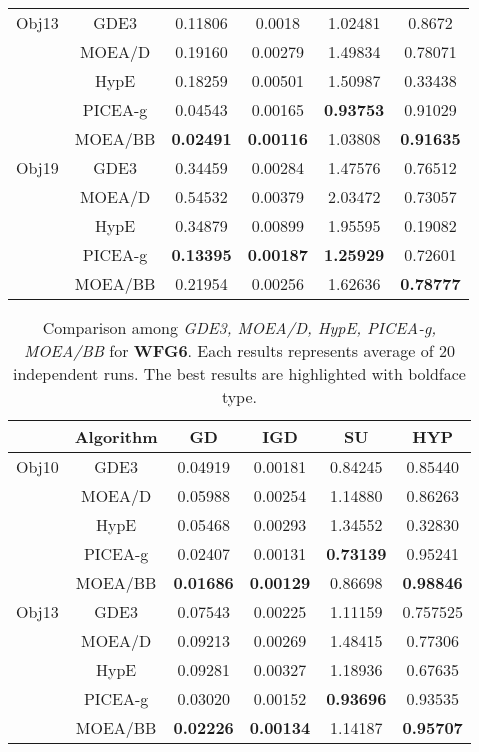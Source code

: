 \begin{center}
\begin{table}[!h]
\begin{tabular}{| c | c | c | c | c | c |}
Obj13	&GDE3		&0.11806			&0.0018				&1.02481			&0.8672\\\cline{2-6}
		&MOEA/D		&0.19160			&0.00279			&1.49834			&0.78071\\\cline{2-6}
		&HypE		&0.18259			&0.00501			&1.50987			&0.33438\\\cline{2-6}
		&PICEA-g	&0.04543			&0.00165			&\textbf{0.93753}	&0.91029\\\cline{2-6}
		&MOEA/BB	&\textbf{0.02491}	&\textbf{0.00116}	&1.03808			&\textbf{0.91635}\\\hline					
		
Obj19	&GDE3		&0.34459			&0.00284			&1.47576			&0.76512\\\cline{2-6}
		&MOEA/D		&0.54532			&0.00379			&2.03472			&0.73057\\\cline{2-6}
		&HypE		&0.34879			&0.00899			&1.95595			&0.19082\\\cline{2-6}
		&PICEA-g	&\textbf{0.13395}	&\textbf{0.00187}	&\textbf{1.25929}	&0.72601\\\cline{2-6}
		&MOEA/BB	&0.21954			&0.00256			&1.62636			&\textbf{0.78777}\\
\hline
\end{tabular}

\label{tab:wfg5}

\end{table}
\begin{table}[!h]
\caption{Comparison among \textit{GDE3, MOEA/D, HypE, PICEA-g, MOEA/BB} for \textbf{WFG6}. Each results represents average of 20 independent runs. The best results are highlighted with boldface type.}
\begin{tabular}{| c | c | c | c | c | c |}

\hline
&\textbf{Algorithm}	&\textbf{GD}&\textbf{IGD}&\textbf{SU}&\textbf{HYP}\\\hline
Obj10	&GDE3		&0.04919			&0.00181			&0.84245			&0.85440\\\cline{2-6}
		&MOEA/D		&0.05988			&0.00254			&1.14880			&0.86263\\\cline{2-6}
		&HypE		&0.05468			&0.00293			&1.34552			&0.32830\\\cline{2-6}
		&PICEA-g	&0.02407			&0.00131			&\textbf{0.73139}	&0.95241\\\cline{2-6}
		&MOEA/BB	&\textbf{0.01686}	&\textbf{0.00129}	&0.86698			&\textbf{0.98846}\\\hline
		
Obj13	&GDE3		&0.07543			&0.00225			&1.11159			&0.757525\\\cline{2-6}
		&MOEA/D		&0.09213			&0.00269			&1.48415			&0.77306\\\cline{2-6}
		&HypE		&0.09281			&0.00327			&1.18936			&0.67635\\\cline{2-6}
		&PICEA-g	&0.03020			&0.00152			&\textbf{0.93696}	&0.93535\\\cline{2-6}
		&MOEA/BB	&\textbf{0.02226}	&\textbf{0.00134}	&1.14187			&\textbf{0.95707}\\\hline					
		

\end{tabular}
\end{table}
\end{center}
